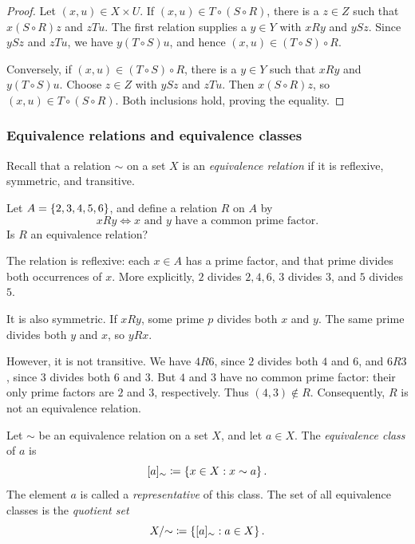 \documentclass[11pt,a4paper]{amsart}
\begin{document}
\begin{proof}
  Let \((x,u) \in X \times U\). If
  \((x,u) \in T \circ (S \circ R)\), there is a \(z \in Z\) such that
  \(x(S \circ R)z\) and \(zTu\). The first relation supplies a
  \(y \in Y\) with \(xRy\) and \(ySz\). Since \(ySz\) and \(zTu\),
  we have \(y(T \circ S)u\), and hence
  \((x,u) \in (T \circ S) \circ R\).

  Conversely, if \((x,u) \in (T \circ S) \circ R\), there is a
  \(y \in Y\) such that \(xRy\) and \(y(T \circ S)u\). Choose
  \(z \in Z\) with \(ySz\) and \(zTu\). Then \(x(S \circ R)z\),
  so \((x,u) \in T \circ (S \circ R)\). Both inclusions hold, proving
  the equality.
\end{proof}

\subsubsection{Equivalence relations and equivalence classes}

Recall that a relation \(\sim\) on a set \(X\) is an
\emph{equivalence relation} if it is reflexive, symmetric, and transitive.

\begin{problem}
  Let \(A = \left\lbrace2,3,4,5,6\right\rbrace\), and define a relation \(R\) on \(A\) by
  \[
    xRy \iff x \text{ and } y \text{ have a common prime factor}.
  \]
  Is \(R\) an equivalence relation?
\end{problem}

\begin{solution}
  The relation is reflexive: each \(x \in A\) has a prime factor, and that
  prime divides both occurrences of \(x\). More explicitly, \(2\) divides
  \(2,4,6\), \(3\) divides \(3\), and \(5\) divides \(5\).

  It is also symmetric. If \(xRy\), some prime \(p\) divides both \(x\)
  and \(y\). The same prime divides both \(y\) and \(x\), so \(yRx\).

  However, it is not transitive. We have \(4R6\), since \(2\) divides
  both \(4\) and \(6\), and \(6R3\), since \(3\) divides both \(6\)
  and \(3\). But \(4\) and \(3\) have no common prime factor: their
  only prime factors are \(2\) and \(3\), respectively. Thus
  \((4,3) \notin R\). Consequently, \(R\) is not an equivalence relation.
\end{solution}

\begin{definition}
  Let \(\sim\) be an equivalence relation on a set \(X\), and let
  \(a \in X\). The \emph{equivalence class} of \(a\) is
  \[
    [a]_{\sim} \coloneqq \left\lbrace x \in X : x \sim a\right\rbrace.
  \]
  The element \(a\) is called a \emph{representative} of this class.
  The set of all equivalence classes is the \emph{quotient set}
  \[
    X/{\sim} \coloneqq \left\lbrace[a]_{\sim} : a \in X\right\rbrace.
  \]
\end{definition}
\end{document}
